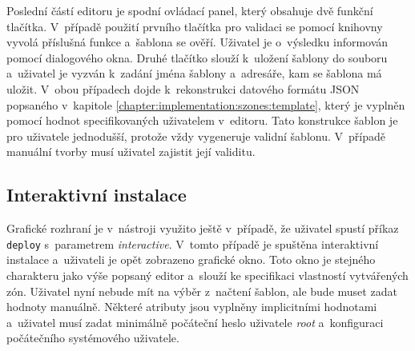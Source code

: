 Poslední částí editoru je spodní ovládací panel, který obsahuje dvě funkční tlačítka. V~případě použití prvního tlačítka
pro validaci se pomocí knihovny vyvolá příslušná funkce a~šablona se ověří. Uživatel je o~výsledku informován pomocí dialogového
okna. Druhé tlačítko slouží k~uložení šablony do souboru a~uživatel je vyzván k~zadání jména šablony a~adresáře, kam se šablona má uložit.
V~obou případech dojde k~rekonstrukci datového formátu JSON popsaného v~kapitole \ref{chapter:implementation:szones:template},
který je vyplněn pomocí hodnot specifikovaných uživatelem v~editoru. Tato konstrukce šablon je pro uživatele jednodušší, protože
vždy vygeneruje validní šablonu. V~případě manuální tvorby musí uživatel zajistit její validitu.
\subsection{Interaktivní instalace}
\label{chapter:implementation:gui:interactive}
Grafické rozhraní je v~nástroji využito ještě v~případě, že uživatel spustí příkaz \verb|deploy| s~parametrem \textit{interactive}.
V~tomto případě je spuštěna interaktivní instalace a~uživateli je opět zobrazeno grafické okno. Toto okno je stejného charakteru
jako výše popsaný editor a~slouží ke specifikaci vlastností vytvářených zón. Uživatel nyní nebude mít na výběr z~načtení šablon, ale bude muset
zadat hodnoty manuálně. Některé atributy jsou vyplněny implicitními hodnotami a~uživatel musí zadat minimálně počáteční heslo 
uživatele \textit{root} a~konfiguraci počátečního systémového uživatele.
